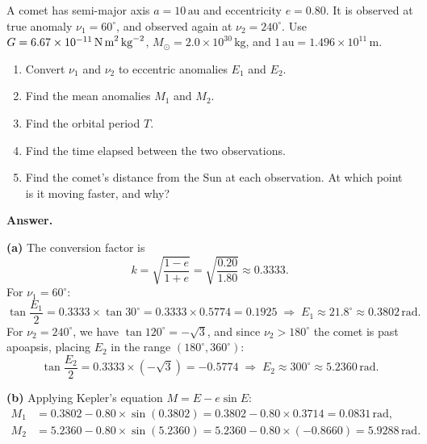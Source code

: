 \documentclass[12pt]{article}
\newenvironment{probbox}[2]{%
  \begin{tcolorbox}[
    enhanced, breakable,
    colback=blue!5!white, colframe=deepblue,
    boxrule=0.8pt, arc=4pt,
    title={\bfseries [#1] Problem #2}
  ]
}{\end{tcolorbox}}
\begin{document}
\begin{probbox}{15 points}{3. Comet Time of Flight}
A comet has semi-major axis $a = 10\,\text{au}$ and eccentricity $e = 0.80$.
It is observed at true anomaly $\nu_1 = 60^\circ$, and observed again at
$\nu_2 = 240^\circ$.
Use $G = 6.67\times10^{-11}\,\text{N\,m}^2\,\text{kg}^{-2}$,
$M_\odot = 2.0\times10^{30}\,\text{kg}$, and
$1\,\text{au} = 1.496\times10^{11}\,\text{m}$.
\begin{enumerate}
  \item[(a)] Convert $\nu_1$ and $\nu_2$ to eccentric anomalies $E_1$ and $E_2$.
  \item[(b)] Find the mean anomalies $M_1$ and $M_2$.
  \item[(c)] Find the orbital period $T$.
  \item[(d)] Find the time elapsed between the two observations.
  \item[(e)] Find the comet's distance from the Sun at each observation.
             At which point is it moving faster, and why?
\end{enumerate}

\medskip
\textbf{\color{blue!60!black}Answer.}

\textbf{(a)} The conversion factor is
\begin{equation*}
  k = \sqrt{\frac{1-e}{1+e}} = \sqrt{\frac{0.20}{1.80}} \approx 0.3333.
\end{equation*}
For $\nu_1 = 60^\circ$:
\begin{equation*}
  \tan\frac{E_1}{2} = 0.3333\times\tan 30^\circ = 0.3333\times 0.5774 = 0.1925
  \;\Rightarrow\; E_1 \approx 21.8^\circ \approx 0.3802\,\text{rad}.
\end{equation*}
For $\nu_2 = 240^\circ$, we have $\tan 120^\circ = -\sqrt{3}$, and since
$\nu_2 > 180^\circ$ the comet is past apoapsis, placing $E_2$ in the range
$(180^\circ, 360^\circ)$:
\begin{equation*}
  \tan\frac{E_2}{2} = 0.3333\times(-\sqrt{3}) = -0.5774
  \;\Rightarrow\; E_2 \approx 300^\circ \approx 5.2360\,\text{rad}.
\end{equation*}

\textbf{(b)} Applying Kepler's equation $M = E - e\sin E$:
\begin{align*}
  M_1 &= 0.3802 - 0.80\times\sin(0.3802)
       = 0.3802 - 0.80\times 0.3714
       = 0.0831\,\text{rad},\\[4pt]
  M_2 &= 5.2360 - 0.80\times\sin(5.2360)
       = 5.2360 - 0.80\times(-0.8660)
       = 5.9288\,\text{rad}.
\end{align*}


\end{probbox}
\end{document}
